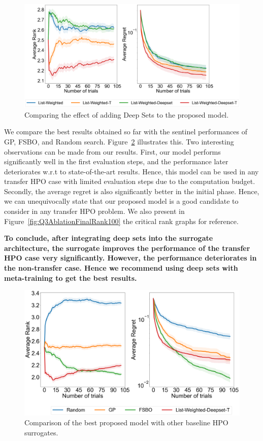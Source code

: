 \documentclass[12pt, twoside, ngerman]{report}
\begin{document}
\begin{figure}[h]
  \centering
    \includegraphics[scale=0.25]{images/Q3Ablation}
    \caption{Comparing the effect of adding Deep Sets to the proposed model.}
    \label{fig:Q3Ablation}
\end{figure}

We compare the best results obtained so far with the sentinel performances of GP,  FSBO,  and Random search. Figure~\ref{fig:Q3AblationFinal} illustrates this.  Two interesting observations can be made from our results. First,  our model performs significantly well in the first evaluation steps, and the performance later deteriorates w.r.t to state-of-the-art results. Hence,  this model can be used in any transfer HPO case with limited evaluation steps due to the computation budget. Secondly,   the average regret is also significantly better in the initial phase. Hence, we can unequivocally state that our proposed model is a good candidate to consider in any transfer HPO problem. 
We also present in Figure~\ref{fig:Q3AblationFinalRank100} the critical rank graphs for reference.

\textbf{To conclude, after integrating deep sets into the surrogate architecture,  the surrogate improves the performance of the transfer HPO case very significantly. However, the performance deteriorates in the non-transfer case. Hence we recommend using deep sets with meta-training to get the best results.}

\begin{figure}[h]
  \centering
    \includegraphics[scale=0.25]{images/Q3AblationFinal}
    \caption{Comparison of the best proposed model with other baseline HPO surrogates.}
    \label{fig:Q3AblationFinal}
\end{figure}
\end{document}
